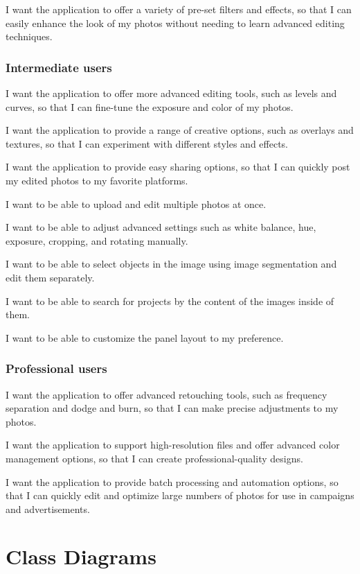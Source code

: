 \documentclass[11pt,a4paper]{article}
\begin{document}
I want the application to offer a variety of pre-set filters and effects, so
that I can easily enhance the look of my photos without needing to learn
advanced editing techniques.

\subsubsection*{Intermediate users}

I want the application to offer more advanced editing tools, such as levels and
curves, so that I can fine-tune the exposure and color of my photos.

I want the application to provide a range of creative options, such as overlays
and textures, so that I can experiment with different styles and effects.

I want the application to provide easy sharing options, so that I can quickly
post my edited photos to my favorite platforms.

I want to be able to upload and edit multiple photos at once.

I want to be able to adjust advanced settings such as white balance, hue,
exposure, cropping, and rotating manually.

I want to be able to select objects in the image using image segmentation and
edit them separately.

I want to be able to search for projects by the content of the images inside of
them.

I want to be able to customize the panel layout to my preference.


\subsubsection*{Professional users}

I want the application to offer advanced retouching tools, such as frequency
separation and dodge and burn, so that I can make precise adjustments to my
photos.

I want the application to support high-resolution files and offer advanced color
management options, so that I can create professional-quality designs.

I want the application to provide batch processing and automation options, so
that I can quickly edit and optimize large numbers of photos for use in
campaigns and advertisements.

\pagebreak

\section*{Class Diagrams}
\end{document}
